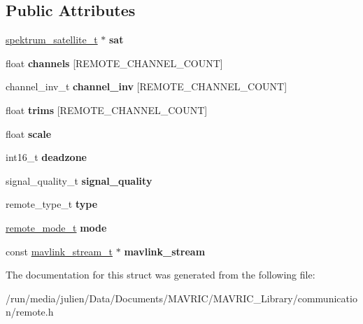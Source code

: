 \subsection*{Public Attributes}
\begin{DoxyCompactItemize}
\item 
\hypertarget{structremote__t_af905b769182795ae89751f080fa70ab1}{\hyperlink{structspektrum__satellite__t}{spektrum\+\_\+satellite\+\_\+t} $\ast$ {\bfseries sat}}\label{structremote__t_af905b769182795ae89751f080fa70ab1}

\item 
\hypertarget{structremote__t_a3f5bd50dfe990673411526a023602776}{float {\bfseries channels} \mbox{[}R\+E\+M\+O\+T\+E\+\_\+\+C\+H\+A\+N\+N\+E\+L\+\_\+\+C\+O\+U\+N\+T\mbox{]}}\label{structremote__t_a3f5bd50dfe990673411526a023602776}

\item 
\hypertarget{structremote__t_a90644a21324c37f5709041e7ca7b0af5}{channel\+\_\+inv\+\_\+t {\bfseries channel\+\_\+inv} \mbox{[}R\+E\+M\+O\+T\+E\+\_\+\+C\+H\+A\+N\+N\+E\+L\+\_\+\+C\+O\+U\+N\+T\mbox{]}}\label{structremote__t_a90644a21324c37f5709041e7ca7b0af5}

\item 
\hypertarget{structremote__t_a0e6fbf6d52612fd4572dd1bf8d07a7ff}{float {\bfseries trims} \mbox{[}R\+E\+M\+O\+T\+E\+\_\+\+C\+H\+A\+N\+N\+E\+L\+\_\+\+C\+O\+U\+N\+T\mbox{]}}\label{structremote__t_a0e6fbf6d52612fd4572dd1bf8d07a7ff}

\item 
\hypertarget{structremote__t_ab3eb4c60a1ae61dde79e37037c8e1527}{float {\bfseries scale}}\label{structremote__t_ab3eb4c60a1ae61dde79e37037c8e1527}

\item 
\hypertarget{structremote__t_aa81abd1895796d45176c7221e120fbe0}{int16\+\_\+t {\bfseries deadzone}}\label{structremote__t_aa81abd1895796d45176c7221e120fbe0}

\item 
\hypertarget{structremote__t_a5eb14a352a516d5d95e99946100b8db3}{signal\+\_\+quality\+\_\+t {\bfseries signal\+\_\+quality}}\label{structremote__t_a5eb14a352a516d5d95e99946100b8db3}

\item 
\hypertarget{structremote__t_a9b75453e70fb2c3dcb63d73f3217dfaa}{remote\+\_\+type\+\_\+t {\bfseries type}}\label{structremote__t_a9b75453e70fb2c3dcb63d73f3217dfaa}

\item 
\hypertarget{structremote__t_a51d0a966b43de8bbe17b942b94d0382e}{\hyperlink{structremote__mode__t}{remote\+\_\+mode\+\_\+t} {\bfseries mode}}\label{structremote__t_a51d0a966b43de8bbe17b942b94d0382e}

\item 
\hypertarget{structremote__t_a36e8b32f76bfe65b2fd946fab9dfea49}{const \hyperlink{structmavlink__stream__t}{mavlink\+\_\+stream\+\_\+t} $\ast$ {\bfseries mavlink\+\_\+stream}}\label{structremote__t_a36e8b32f76bfe65b2fd946fab9dfea49}

\end{DoxyCompactItemize}


The documentation for this struct was generated from the following file\+:\begin{DoxyCompactItemize}
\item 
/run/media/julien/\+Data/\+Documents/\+M\+A\+V\+R\+I\+C/\+M\+A\+V\+R\+I\+C\+\_\+\+Library/communication/remote.\+h\end{DoxyCompactItemize}
